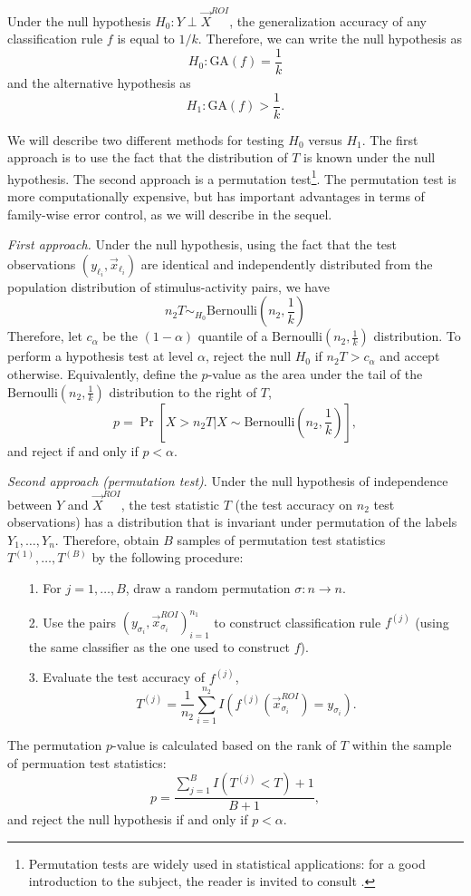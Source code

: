 Under the null hypothesis $H_0: Y \perp \vec{X}^{ROI}$, the
generalization accuracy of any classification rule $f$ is equal to
$1/k$.  Therefore, we can write the null hypothesis as
\[
H_0: \text{GA}(f) = \frac{1}{k}
\]
and the alternative hypothesis as
\[
H_1: \text{GA}(f) > \frac{1}{k}.
\]

We will describe two different methods for testing $H_0$ versus $H_1$.
The first approach is to use the fact that the distribution of $T$ is
known under the null hypothesis.  The second approach is a permutation
test\footnote{Permutation tests are
widely used in statistical applications: for a good introduction to
the subject, the reader is invited to consult
\cite{efron1994introduction}.}.  The permutation test is more computationally expensive, but has
important advantages in terms of family-wise error control, as we will
describe in the sequel. %

\emph{First approach.} Under the null hypothesis, using the fact that
the test observations $(y_{\ell_i}, \vec{x}_{\ell_i})$ are identical
and independently distributed from the population distribution of
stimulus-activity pairs, we have
\[
n_2 T \sim_{H_0} \text{Bernoulli}(n_2, \frac{1}{k})
\]
Therefore, let $c_\alpha$ be the $(1-\alpha)$ quantile of a
$\text{Bernoulli}(n_2, \frac{1}{k})$ distribution.  To perform a
hypothesis test at level $\alpha$, reject the null $H_0$ if $n_2 T >
c_\alpha$ and accept otherwise.  Equivalently, define the $p$-value as
the area under the tail of the $\text{Bernoulli}(n_2,
\frac{1}{k})$ distribution to the right of $T$,
\[
p = \Pr[X > n_2 T| X \sim \text{Bernoulli}(n_2, \frac{1}{k})],
\]
and reject if and only if $p < \alpha$.

\emph{Second approach (permutation test)}.  Under the null hypothesis of
independence between $Y$ and $\vec{X}^{ROI}$, the test statistic $T$
(the test accuracy on $n_2$ test observations) has a distribution that
is invariant under permutation of the labels $Y_1,\hdots, Y_n$.
Therefore, obtain $B$ samples of permutation test statistics
$T^{(1)},\hdots, T^{(B)}$ by the following procedure:
\begin{itemize}
\item[1.] For $j = 1,\hdots, B$, draw a random permutation $\sigma: n \to n$.
\item[2.] Use the pairs
  $(y_{\sigma_i},\vec{x}^{ROI}_{\sigma_i})_{i=1}^{n_1}$ to construct
  classification rule $f^{(j)}$ (using the same classifier as the one
  used to construct $f$).
\item[3.] Evaluate the test accuracy of $f^{(j)}$,
\[
T^{(j)}= \frac{1}{n_2} \sum_{i=1}^{n_2} I(f^{(j)}(\vec{x}_{\sigma_i}^{ROI}) = y_{\sigma_i}).
\]
\end{itemize}
The permutation $p$-value is calculated based on the rank of $T$ within the sample of permuation test statistics:
\[
p = \frac{\sum_{j=1}^B I(T^{(j)} < T) + 1}{B + 1},
\]
and reject the null hypothesis if and only if $p < \alpha$.

